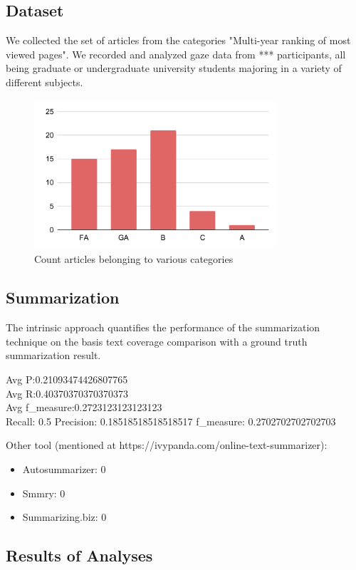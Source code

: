 \documentclass[12pt]{article}
\begin{document}
\subsection{Dataset}

We collected the set of articles from the categories "Multi-year ranking of most viewed pages". We recorded and analyzed gaze data from *** participants, all being graduate or undergraduate university students 
majoring in a variety of different subjects.


\begin{figure}[!htb]
    \center \includegraphics[width= 9cm]{images/article_category.pdf}
    \caption{\label{fig:article_category} Count articles belonging to various categories}
\end{figure}


\subsection{Summarization}
The intrinsic approach quantifies the performance of the summarization technique on the basis text coverage comparison with a ground truth summarization result. 


Avg P:0.21093474426807765\\
Avg R:0.40370370370370373\\
Avg f\_measure:0.2723123123123123\\

Recall: 0.5
Precision: 0.18518518518518517
f\_measure: 0.2702702702702703

Other tool (mentioned at https://ivypanda.com/online-text-summarizer):\\
\begin{itemize}
\item Autosummarizer: 0
\item Smmry: 0
\item Summarizing.biz: 0
\end{itemize}

\subsection{Results of Analyses}
\end{document}
